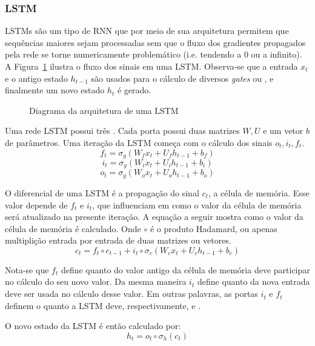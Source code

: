 \subsubsection{LSTM}
\label{sec:lstm}

LSTMs \citep{lstm} são um tipo de RNN que por meio de sua arquitetura permitem que sequências
maiores sejam processadas sem que o fluxo dos gradientes propagados pela rede se torne
numericamente problemático (i.e. tendendo a 0 ou a infinito). A
Figura~\ref{fig:lstm} ilustra o fluxo dos sinais em uma LSTM. Observa-se que a
entrada $x_t$ e o antigo estado $h_{t-1}$ são usados para o cálculo de diversos \textit{gates} ou , e
finalmente um novo estado $h_t$ é gerado.\\

\begin{figure}
\centering
\caption{Diagrama da arquitetura de uma LSTM}

\label{fig:lstm}
\end{figure}




Uma rede LSTM possui três . Cada porta possui duas matrizes $W,U$ e um
vetor $b$ de parâmetros. Uma iteração da LSTM começa com o cálculo dos sinais
$o_t,i_t,f_t$.\\

\[f_t = \sigma_g(W_fx_t + U_fh_{t-1} + b_f)\]
\[i_t = \sigma_g(W_ix_t + U_ih_{t-1} + b_i)\]
\[o_t = \sigma_g(W_ox_t + U_oh_{t-1} + b_o)\]

O diferencial de uma LSTM é a propagação do sinal $c_t$, a célula de memória.
Esse valor depende de $f_t$ e $i_t$, que influenciam em como o valor da
célula de memória será atualizado na presente iteração. A equação a seguir
mostra como o valor da célula de memória é calculado. Onde $\circ$ é o produto Hadamard, ou apenas multiplição entrada por entrada de
duas matrizes ou vetores. \\

\[c_t = f_t \circ c_{t-1} + i_t \circ \sigma_c(W_cx_t + U_ch_{t-1} + b_c)\]

Nota-se que $f_t$
define quanto do valor antigo da célula de memória deve participar no cálculo do
seu novo valor. 
Da mesma maneira $i_t$ define quanto da nova entrada deve ser usada no cálculo desse valor.
Em outras palavras, as portas $i_t$ e $f_t$ definem o quanto a LSTM deve,
respectivamente,  e .


O novo estado da LSTM é então calculado por: \\
\[h_t = o_t \circ \sigma_h(c_t)\]




